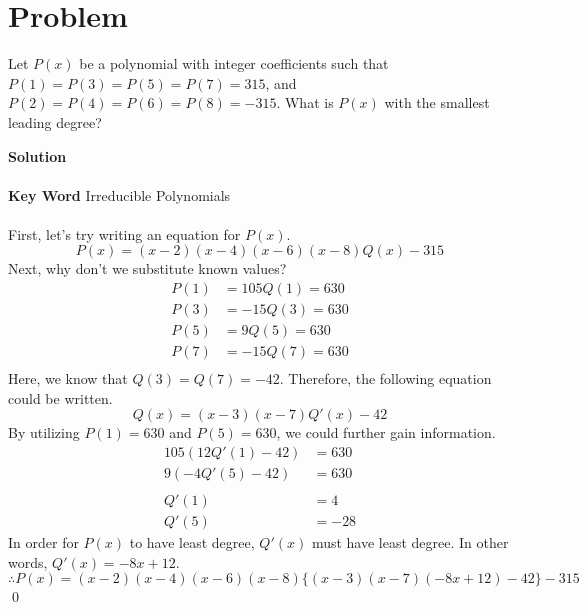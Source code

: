 \documentclass{article}
\newenvironment{solution}{\begin{trivlist}\item[]{\bf Solution}}{\qed \end{trivlist}}
\begin{document}
\section*{Problem}
Let $P(x)$ be a polynomial with integer coefficients such that $P(1)=P(3)=P(5)=P(7)=315$, and $P(2)=P(4)=P(6)=P(8)=-315$. What is $P(x)$ with the smallest leading degree?
\begin{solution}
\\\\
\textbf{Key Word} Irreducible Polynomials
\\\\
First, let's try writing an equation for $P(x)$.
\[
P(x)=(x-2)(x-4)(x-6)(x-8)Q(x)-315
\]
Next, why don't we substitute known values?
\begin{align*}
    P(1) &= 105Q(1) = 630 \\
    P(3) &= -15Q(3) = 630 \\
    P(5) &= 9Q(5) = 630 \\
    P(7) &= -15Q(7) = 630 \\
\end{align*}
Here, we know that $Q(3)=Q(7)=-42$. Therefore, the following equation could be written.
\[
Q(x) = (x-3)(x-7)Q'(x)-42
\]
By utilizing $P(1)=630$ and $P(5)=630$, we could further gain information.
\begin{align*}
    105(12Q'(1)-42) &= 630 \\
    9(-4Q'(5)-42) &= 630
    \\\\
    Q'(1) &= 4 \\
    Q'(5) &= -28
\end{align*}
In order for $P(x)$ to have least degree, $Q'(x)$ must have least degree. In other words, $Q'(x)=-8x+12$.
\[
\therefore \boxed{P(x)=(x-2)(x-4)(x-6)(x-8)\{(x-3)(x-7)(-8x+12)-42\}-315}
\]
\end{solution}

\newpage
\end{document}
